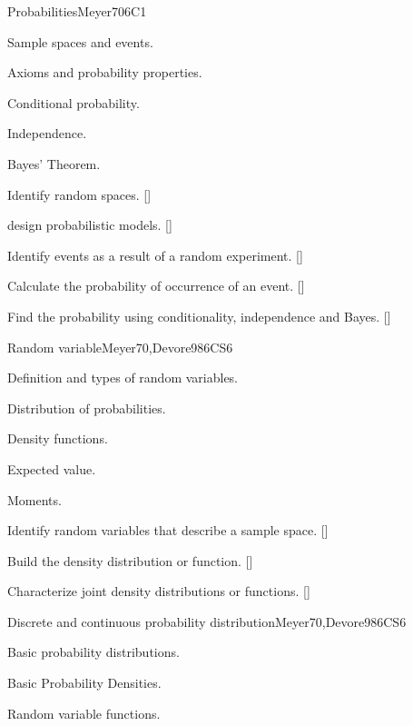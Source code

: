 \begin{syllabus}
\begin{unit}{}{Probabilities}{Meyer70}{6}{C1}
\begin{topics}
      \item Sample spaces and events.
      \item Axioms and probability properties.
      \item Conditional probability.
      \item Independence.
      \item Bayes' Theorem.
   \end{topics}
   \begin{learningoutcomes}
      \item Identify random spaces. [\Usage]
      \item design probabilistic models. [\Usage]
      \item Identify events as a result of a random experiment. [\Usage]
      \item Calculate the probability of occurrence of an event. [\Usage]
      \item Find the probability using conditionality, independence and Bayes. [\Usage]
   \end{learningoutcomes}
\end{unit}

\begin{unit}{}{Random variable}{Meyer70,Devore98}{6}{CS6}
\begin{topics}
      \item Definition and types of random variables.
      \item Distribution of probabilities.
      \item Density functions.
      \item Expected value.
      \item Moments.
   \end{topics}

   \begin{learningoutcomes}
      \item Identify random variables that describe a sample space. [\Usage]
      \item Build the density distribution or function. [\Usage]
      \item Characterize joint density distributions or functions. [\Usage]
   \end{learningoutcomes}
\end{unit}

\begin{unit}{}{Discrete and continuous probability distribution}{Meyer70,Devore98}{6}{CS6}
\begin{topics}
      \item Basic probability distributions.
      \item Basic Probability Densities.
      \item Random variable functions.
   \end{topics}


\end{unit}
\end{syllabus}
